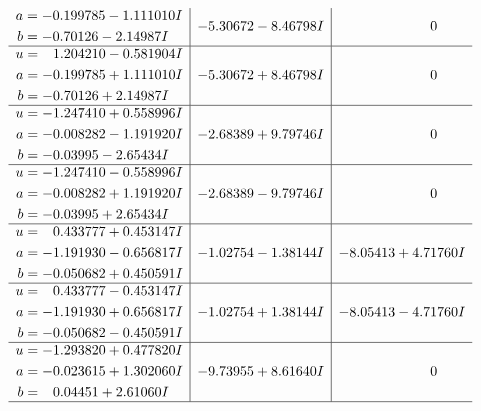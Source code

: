 \documentclass[1p]{elsarticle_modified}
\theoremstyle{definition}
\begin{document}
$$\begin{array}{c|c|c}
\begin{aligned}
a &= -0.199785 - 1.111010 I \\
b &= -0.70126 - 2.14987 I\end{aligned}
 & -5.30672 - 8.46798 I & \phantom{-0.000000 } 0 \\ \hline\begin{aligned}
u &= \phantom{-}1.204210 - 0.581904 I \\
a &= -0.199785 + 1.111010 I \\
b &= -0.70126 + 2.14987 I\end{aligned}
 & -5.30672 + 8.46798 I & \phantom{-0.000000 } 0 \\ \hline\begin{aligned}
u &= -1.247410 + 0.558996 I \\
a &= -0.008282 - 1.191920 I \\
b &= -0.03995 - 2.65434 I\end{aligned}
 & -2.68389 + 9.79746 I & \phantom{-0.000000 } 0 \\ \hline\begin{aligned}
u &= -1.247410 - 0.558996 I \\
a &= -0.008282 + 1.191920 I \\
b &= -0.03995 + 2.65434 I\end{aligned}
 & -2.68389 - 9.79746 I & \phantom{-0.000000 } 0 \\ \hline\begin{aligned}
u &= \phantom{-}0.433777 + 0.453147 I \\
a &= -1.191930 - 0.656817 I \\
b &= -0.050682 + 0.450591 I\end{aligned}
 & -1.02754 - 1.38144 I & -8.05413 + 4.71760 I \\ \hline\begin{aligned}
u &= \phantom{-}0.433777 - 0.453147 I \\
a &= -1.191930 + 0.656817 I \\
b &= -0.050682 - 0.450591 I\end{aligned}
 & -1.02754 + 1.38144 I & -8.05413 - 4.71760 I \\ \hline\begin{aligned}
u &= -1.293820 + 0.477820 I \\
a &= -0.023615 + 1.302060 I \\
b &= \phantom{-}0.04451 + 2.61060 I\end{aligned}
 & -9.73955 + 8.61640 I & \phantom{-0.000000 } 0\\
 \hline 
 \end{array}$$\newpage$$\begin{array}{c|c|c}  

\end{array}$$
\end{document}
